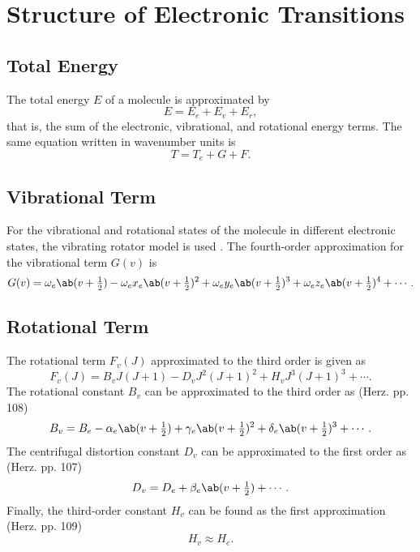 \chapter{Structure of Electronic Transitions}
\label{c:structure_of_electronic_transitions}

\section{Total Energy}
\label{s:total_energy}

The total energy $E$ of a molecule is approximated by
\begin{equation*}
    E = E_e + E_v + E_r,
\end{equation*}
that is, the sum of the electronic, vibrational, and rotational energy terms. The same equation written in wavenumber units is
\begin{equation}
    T = T_e + G + F.
\end{equation}

\section{Vibrational Term}
\label{s:vibrational_term}

For the vibrational and rotational states of the molecule in different electronic states, the vibrating rotator model is used \cite{herzbergMolecularSpectraMolecular1950}. The fourth-order approximation for the vibrational term $G(v)$ is
\begin{equation}
    G(v) = \omega_e\ab(v + \tfrac{1}{2}) - \omega_ex_e\ab(v + \tfrac{1}{2})^2 + \omega_ey_e\ab(v + \tfrac{1}{2})^3 + \omega_ez_e\ab(v + \tfrac{1}{2})^4 + \dotsb.
\end{equation}

\section{Rotational Term}
\label{s:rotational_term}

The rotational term $F_v(J)$ approximated to the third order is given as
\begin{equation}
    F_v(J) = B_vJ(J + 1) - D_vJ^2(J + 1)^2 + H_vJ^3(J + 1)^3 + \dotsb.
\end{equation}
The rotational constant $B_v$ can be approximated to the third order as (Herz. pp. 108)
\begin{equation*}
    B_v = B_e - \alpha_e\ab(v + \tfrac{1}{2}) + \gamma_e\ab(v + \tfrac{1}{2})^2 + \delta_e\ab(v + \tfrac{1}{2})^3 + \dotsb.
\end{equation*}
The centrifugal distortion constant $D_v$ can be approximated to the first order as (Herz. pp. 107)
\begin{equation}
    D_v = D_e + \beta_e\ab(v + \tfrac{1}{2}) + \dotsb.
\end{equation}
Finally, the third-order constant $H_v$ can be found as the first approximation (Herz. pp. 109)
\begin{equation}
    H_v \approx H_e.
\end{equation}

